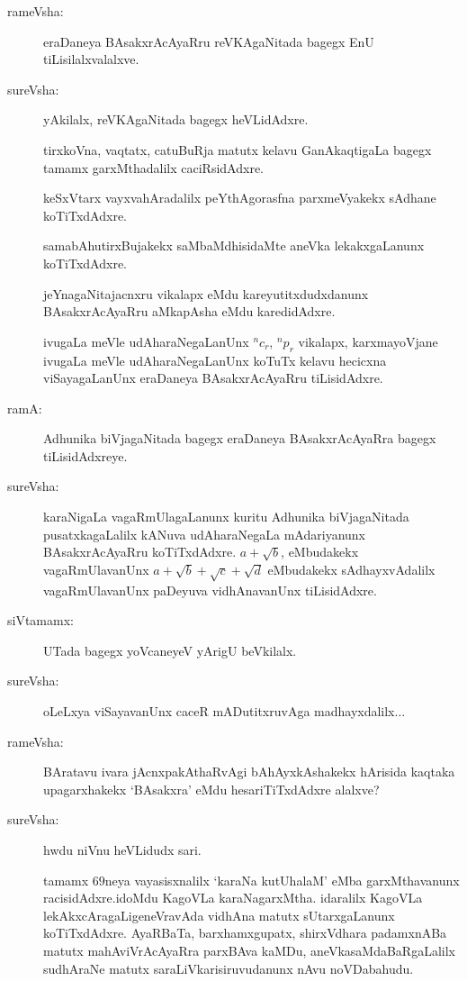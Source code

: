 \begin{description}
\item[rameVsha:] eraDaneya BAsakxrAcAyaRru reVKAgaNitada bagegx EnU tiLisilalxvalalxve.

\item[sureVsha:] yAkilalx, reVKAgaNitada bagegx heVLidAdxre.

tirxkoVna, vaqtatx, catuBuRja matutx kelavu GanAkaqtigaLa bagegx tamamx garxMthadalilx caciRsidAdxre.

keSxVtarx vayxvahAradalilx peYthAgorasfna parxmeVyakekx sAdhane koTiTxdAdxre.

samabAhutirxBujakekx saMbaMdhisidaMte aneVka lekakxgaLanunx koTiTxdAdxre.

jeYnagaNitajacnxru vikalapx eMdu kareyutitxdudxdanunx BAsakxrAcAyaRru aMkapAsha eMdu karedidAdxre.

ivugaLa meVle udAharaNegaLanUnx ${}^{n}c_{r}$, ${}^{n}p_{r}$ vikalapx, karxmayoVjane ivugaLa meVle udAharaNegaLanUnx koTuTx kelavu hecicxna viSayagaLanUnx eraDaneya BAsakxrAcAyaRru tiLisidAdxre.

\item[ramA:] Adhunika biVjagaNitada bagegx eraDaneya BAsakxrAcAyaRra bagegx tiLisi\-dAdxreye.

\item[sureVsha:] karaNigaLa vagaRmUlagaLanunx kuritu Adhunika biVjagaNitada pusatxkagaLalilx kANuva udAharaNegaLa mAdariyanunx BAsakxrAcAyaRru koTiTxdAdxre. $a+\sqrt{b}$, eMbudakekx vagaRmUlavanUnx $a+\sqrt{b}+\sqrt{c}+\sqrt{d}$ eMbudakekx sAdhayxvAdalilx vagaRmUlavanUnx paDeyuva vidhAnavanUnx tiLisidAdxre.

\item[siVtamamx:] UTada bagegx yoVcaneyeV yArigU beVkilalx.

\item[sureVsha:] oLeLxya viSayavanUnx caceR mADutitxruvAga madhayxdalilx...

\item[rameVsha:] BAratavu ivara jAcnxpakAthaRvAgi bAhAyxkAshakekx hArisida kaqtaka upagarxhakekx `BAsakxra' eMdu hesariTiTxdAdxre alalxve?

\item[sureVsha:] hwdu niVnu heVLidudx sari.

tamamx $69$neya vayasisxnalilx `karaNa kutUhalaM' eMba garxMthavanunx racisidAdxre.\break idoMdu KagoVLa karaNagarxMtha. idaralilx KagoVLa lekAkxcAragaLige\break neVravAda vidhAna matutx sUtarxgaLanunx koTiTxdAdxre. AyaRBaTa, barxhamxgupatx,\- shirxVdhara padamxnABa matutx mahAviVrAcAyaRra parxBAva kaMDu, aneVka\break saMdaBaRgaLalilx sudhAraNe matutx saraLiVkarisiruvudanunx nAvu noVDabahudu.


\end{description}
